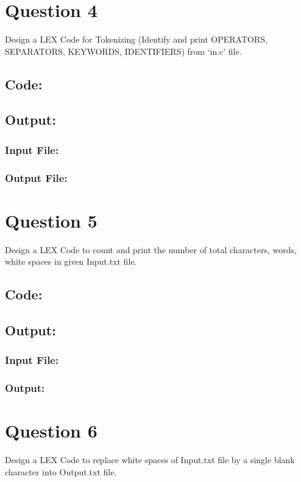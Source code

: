\documentclass{article}
\begin{document}
\newpage
\section*{Question 4}
Design a LEX Code for Tokenizing
(Identify and print OPERATORS, SEPARATORS, KEYWORDS,
IDENTIFIERS)  from `in.c' file.
\subsection*{Code:}

\newpage
\subsection*{Output:}
\subsubsection*{Input File:}

\subsubsection*{Output File:}


\newpage
\section*{Question 5}
Design a LEX Code to count and print the number of total
characters, words, white spaces in given Input.txt file.
\subsection*{Code:}

\newpage
\subsection*{Output:}
\subsubsection*{Input File:}

\subsubsection*{Output:}


\newpage
\section*{Question 6}
Design a LEX Code to replace white spaces of Input.txt
file by a single blank character into Output.txt file.
\end{document}
